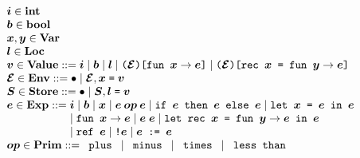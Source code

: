 \documentclass[11pt]{jarticle}
\begin{document}
\[\begin{array}{l}
\EvalRefMLiiiMV{i}[] \in \mathbf{int}\\
\EvalRefMLiiiMV{b}[] \in \mathbf{bool}\\
\EvalRefMLiiiMV{x}[], \EvalRefMLiiiMV{y}[] \in
\mathbf{Var}\\
\EvalRefMLiiiMV{l}[] \in \mathbf{Loc}\\
\EvalRefMLiiiMV{v}[] \in \mathbf{Value} ::= \EvalRefMLiiiMV{i}[]
\mid \EvalRefMLiiiMV{b}[] \mid \EvalRefMLiiiMV{l}[]
\mid \EvalRefMLiiiFunTerm{\EvalRefMLiiiMV{env}[]}{\EvalRefMLiiiMV{x}[]}
{\EvalRefMLiiiMV{e}[]} \mid \EvalRefMLiiiRecTerm{\EvalRefMLiiiMV{env}[]}
{\EvalRefMLiiiMV{x}[]}{\EvalRefMLiiiMV{y}[]}
{\EvalRefMLiiiMV{e}[]}\\
\EvalRefMLiiiMV{env}[] \in \mathbf{Env} ::= \EvalRefMLiiiEmptyTerm
\mid \EvalRefMLiiiBindTerm{\EvalRefMLiiiMV{env}[]}{\EvalRefMLiiiMV{x}[]}
{\EvalRefMLiiiMV{v}[]}\\
\EvalRefMLiiiMV{s}[] \in \mathbf{Store} ::= \EvalRefMLiiiEmptySTerm
\mid \EvalRefMLiiiBlockTerm{\EvalRefMLiiiMV{s}[]}{\EvalRefMLiiiMV{l}[]}
{\EvalRefMLiiiMV{v}[]}\\
\EvalRefMLiiiMV{e}[] \in \mathbf{Exp} ::= \EvalRefMLiiiMV{i}[]
\mid \EvalRefMLiiiMV{b}[] \mid \EvalRefMLiiiMV{x}[]
\mid \EvalRefMLiiiBinOpTerm{\EvalRefMLiiiMV{op}[]}{\EvalRefMLiiiMV{e}[]}
{\EvalRefMLiiiMV{e}[]} \mid \EvalRefMLiiiIfTerm{\EvalRefMLiiiMV{e}[]}
{\EvalRefMLiiiMV{e}[]}{\EvalRefMLiiiMV{e}[]}
\mid \EvalRefMLiiiLetTerm{\EvalRefMLiiiMV{x}[]}{\EvalRefMLiiiMV{e}[]}
{\EvalRefMLiiiMV{e}[]}  \\ \hspace*{2.0cm}
\mid \EvalRefMLiiiAbsTerm{\EvalRefMLiiiMV{x}[]}
{\EvalRefMLiiiMV{e}[]} \mid \EvalRefMLiiiAppTerm{\EvalRefMLiiiMV{e}[]}
{\EvalRefMLiiiMV{e}[]} \mid \EvalRefMLiiiLetRecTerm{\EvalRefMLiiiMV{x}[]}
{\EvalRefMLiiiMV{y}[]}{\EvalRefMLiiiMV{e}[]}{\EvalRefMLiiiMV{e}[]}
 \\ \hspace*{2.0cm}
\mid \EvalRefMLiiiNewRefTerm{\EvalRefMLiiiMV{e}[]}
\mid \EvalRefMLiiiDerefTerm{\EvalRefMLiiiMV{e}[]}
\mid \EvalRefMLiiiAssignTerm{\EvalRefMLiiiMV{e}[]}
{\EvalRefMLiiiMV{e}[]}\\
\EvalRefMLiiiMV{op}[] \in \mathbf{Prim} ::= \EvalRefMLiiiPlusTerm
\mid \EvalRefMLiiiMinusTerm \mid \EvalRefMLiiiMultTerm
\mid \EvalRefMLiiiLtTerm\\
\end{array}\]
\end{document}
